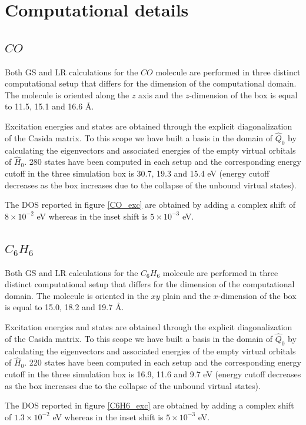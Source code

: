 \documentclass[reprint,aps,prb]{revtex4-1}
\newcommand{\op}[1]{\hat {#1}}
\newcommand{\hnot}{\op{H}_0}
\begin{document}
\section{Computational details}

\subsection{$CO$}

Both GS and LR calculations for the $CO$ molecule are performed in three distinct computational setup that differs for the dimension of the computational
domain. The molecule is oriented along the $z$ axis and the $z$-dimension of the box is equal to 11.5, 15.1 and 16.6 \AA.

Excitation energies and states are obtained through the explicit diagonalization of the Casida matrix. To this scope we have built a basis in the domain of $\op Q_0$ 
by calculating the eigenvectors and associated energies of the empty virtual orbitals of $\hnot$. 280 states have been computed in each setup and the corresponding
energy cutoff in the three simulation box is 30.7, 19.3 and 15.4 eV (energy cutoff decreases as the box increases due to the collapse of the unbound virtual states). 

The DOS reported in figure \ref{CO_exc} are obtained by adding a complex shift of $8\times 10^{-2}$ eV whereas in the inset shift is $5\times 10^{-3}$ eV. 

\subsection{$C_6H_6$}

Both GS and LR calculations for the $C_6H_6$ molecule are performed in three distinct computational setup that differs for the dimension of the computational
domain. The molecule is oriented in the $xy$ plain and the $x$-dimension of the box is equal to 15.0, 18.2 and 19.7 \AA.

Excitation energies and states are obtained through the explicit diagonalization of the Casida matrix. To this scope we have built a basis in the domain of $\op Q_0$ 
by calculating the eigenvectors and associated energies of the empty virtual orbitals of $\hnot$. 220 states have been computed in each setup and the corresponding
energy cutoff in the three simulation box is 16.9, 11.6 and 9.7 eV (energy cutoff decreases as the box increases due to the collapse of the unbound virtual states).  

The DOS reported in figure \ref{C6H6_exc} are obtained by adding a complex shift of $1.3\times 10^{-2}$ eV whereas in the inset shift is $5\times 10^{-3}$ eV. 



%

\end{document}
